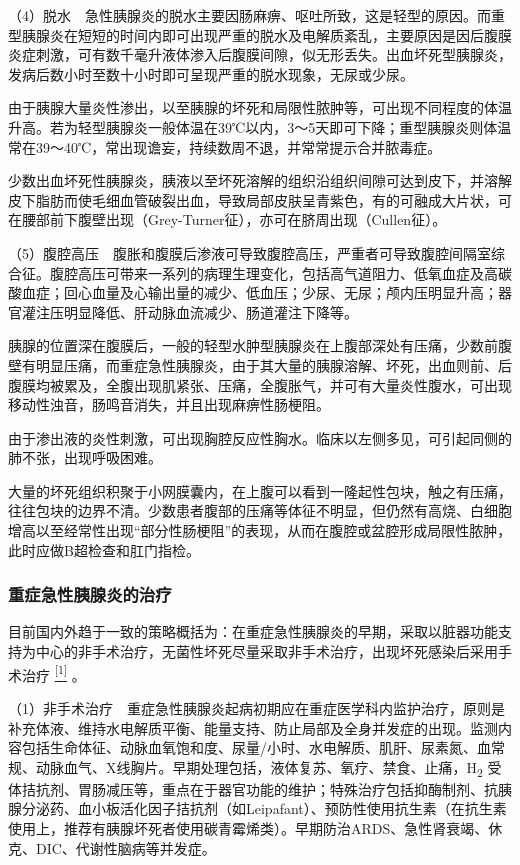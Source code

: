 （4）脱水　急性胰腺炎的脱水主要因肠麻痹、呕吐所致，这是轻型的原因。而重型胰腺炎在短短的时间内即可出现严重的脱水及电解质紊乱，主要原因是因后腹膜炎症刺激，可有数千毫升液体渗入后腹膜间隙，似无形丢失。出血坏死型胰腺炎，发病后数小时至数十小时即可呈现严重的脱水现象，无尿或少尿。

由于胰腺大量炎性渗出，以至胰腺的坏死和局限性脓肿等，可出现不同程度的体温升高。若为轻型胰腺炎一般体温在39℃以内，3～5天即可下降；重型胰腺炎则体温常在39～40℃，常出现谵妄，持续数周不退，并常常提示合并脓毒症。

少数出血坏死性胰腺炎，胰液以至坏死溶解的组织沿组织间隙可达到皮下，并溶解皮下脂肪而使毛细血管破裂出血，导致局部皮肤呈青紫色，有的可融成大片状，可在腰部前下腹壁出现（Grey-Turner征），亦可在脐周出现（Cullen征）。

（5）腹腔高压　腹胀和腹膜后渗液可导致腹腔高压，严重者可导致腹腔间隔室综合征。腹腔高压可带来一系列的病理生理变化，包括高气道阻力、低氧血症及高碳酸血症；回心血量及心输出量的减少、低血压；少尿、无尿；颅内压明显升高；器官灌注压明显降低、肝动脉血流减少、肠道灌注下降等。

胰腺的位置深在腹膜后，一般的轻型水肿型胰腺炎在上腹部深处有压痛，少数前腹壁有明显压痛，而重症急性胰腺炎，由于其大量的胰腺溶解、坏死，出血则前、后腹膜均被累及，全腹出现肌紧张、压痛，全腹胀气，并可有大量炎性腹水，可出现移动性浊音，肠鸣音消失，并且出现麻痹性肠梗阻。

由于渗出液的炎性刺激，可出现胸腔反应性胸水。临床以左侧多见，可引起同侧的肺不张，出现呼吸困难。

大量的坏死组织积聚于小网膜囊内，在上腹可以看到一隆起性包块，触之有压痛，往往包块的边界不清。少数患者腹部的压痛等体征不明显，但仍然有高烧、白细胞增高以至经常性出现“部分性肠梗阻”的表现，从而在腹腔或盆腔形成局限性脓肿，此时应做B超检查和肛门指检。

\subsubsection{重症急性胰腺炎的治疗}

目前国内外趋于一致的策略概括为：在重症急性胰腺炎的早期，采取以脏器功能支持为中心的非手术治疗，无菌性坏死尽量采取非手术治疗，出现坏死感染后采用手术治疗
\protect\hyperlink{text00021.htmlux5cux23ch1-20}{\textsuperscript{{[}1{]}}}
。

（1）非手术治疗　重症急性胰腺炎起病初期应在重症医学科内监护治疗，原则是补充体液、维持水电解质平衡、能量支持、防止局部及全身并发症的出现。监测内容包括生命体征、动脉血氧饱和度、尿量/小时、水电解质、肌肝、尿素氮、血常规、动脉血气、X线胸片。早期处理包括，液体复苏、氧疗、禁食、止痛，H\textsubscript{2}
受体拮抗剂、胃肠减压等，重点在于器官功能的维护；特殊治疗包括抑酶制剂、抗胰腺分泌药、血小板活化因子拮抗剂（如Leipafant）、预防性使用抗生素（在抗生素使用上，推荐有胰腺坏死者使用碳青霉烯类）。早期防治ARDS、急性肾衰竭、休克、DIC、代谢性脑病等并发症。

